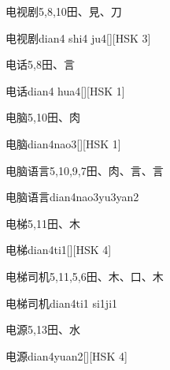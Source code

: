 \begin{entry}{电视剧}{5,8,10}{⽥、⾒、⼑}
  \begin{phonetics}{电视剧}{dian4 shi4 ju4}[][HSK 3]
  \end{phonetics}
\end{entry}

\begin{entry}{电话}{5,8}{⽥、⾔}
  \begin{phonetics}{电话}{dian4 hua4}[][HSK 1]
  \end{phonetics}
\end{entry}

\begin{entry}{电脑}{5,10}{⽥、⾁}
  \begin{phonetics}{电脑}{dian4nao3}[][HSK 1]
  \end{phonetics}
\end{entry}

\begin{entry}{电脑语言}{5,10,9,7}{⽥、⾁、⾔、⾔}
  \begin{phonetics}{电脑语言}{dian4nao3yu3yan2}
  \end{phonetics}
\end{entry}

\begin{entry}{电梯}{5,11}{⽥、⽊}
  \begin{phonetics}{电梯}{dian4ti1}[][HSK 4]
  \end{phonetics}
\end{entry}

\begin{entry}{电梯司机}{5,11,5,6}{⽥、⽊、⼝、⽊}
  \begin{phonetics}{电梯司机}{dian4ti1 si1ji1}
  \end{phonetics}
\end{entry}

\begin{entry}{电源}{5,13}{⽥、⽔}
  \begin{phonetics}{电源}{dian4yuan2}[][HSK 4]
  \end{phonetics}
\end{entry}

